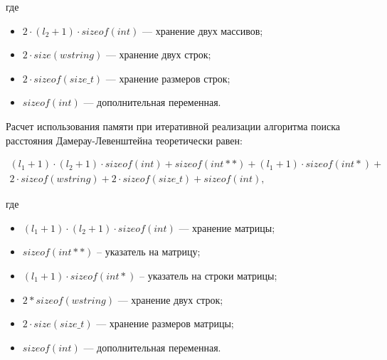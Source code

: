 где 
\begin{itemize}[label=--]
	\item $2 \cdot (l_2 + 1) \cdot sizeof(int)$ --- хранение двух массивов;
	\item $2 \cdot size(wstring)$ --- хранение двух строк;
	\item $2 \cdot sizeof(size\_t)$ --- хранение размеров строк;
	\item $sizeof(int)$ --- дополнительная переменная.
\end{itemize}

Расчет использования памяти при итеративной реализации алгоритма поиска расстояния Дамерау-Левенштейна теоретически равен:

\begin{equation}
	\label{eq:dl_mtr_memory}
	\begin{aligned}
		(l_1 + 1) \cdot (l_2 + 1) \cdot sizeof(int) + sizeof(int **) + (l_1 + 1) \cdot sizeof(int *) +  \\
		2 \cdot sizeof(wstring) + 2 \cdot sizeof(size\_t) + sizeof(int),
	\end{aligned}
\end{equation}

где 
\begin{itemize} [label=--]
	\item $(l_1 + 1) \cdot (l_2 + 1) \cdot sizeof(int)$ --- хранение матрицы;
	\item $sizeof(int **)$ -- указатель на матрицу;
	\item $(l_1 + 1) \cdot sizeof(int *)$ -- указатель на строки матрицы;
	\item $2 * sizeof(wstring)$ --- хранение двух строк;
	\item $2 \cdot size(size\_t)$ --- хранение размеров матрицы;
	\item $sizeof(int)$ --- дополнительная переменная.
\end{itemize}

